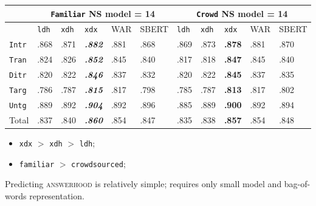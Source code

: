 \documentclass[handout,xcolor={dvipsnames}]{beamer}
\newcommand{\feat}[1]{\textsc{#1}}
\newcommand{\param}[1]{\texttt{#1}}
\begin{document}
\begin{frame}
\begin{table}[htb!]
\begin{center}
\setlength{\tabcolsep}{.35em}
\begin{tabular}{|l||l|l|l||l|l||l|l|l||l|l|}
\hline
 & \multicolumn{5}{c||}{\param{Fam\-il\-iar} NS model = 14} & \multicolumn{5}{c|}{\param{Crowd} NS model = 14} \\
\hline
    		& \param{ldh}	& \param{xdh} &	\param{xdx} & WAR	& {\scriptsize SBERT} & \param{ldh}	& \param{xdh} &	\param{xdx} & WAR	& {\scriptsize SBERT} \\ \hline
\hline
\param{Intr}  & .868 & .871 & \textit{\textbf{.882}} & .881 & .868 & .869 & .873 & \textbf{.878} & .881 & .870 \\ \hline
\param{Tran}  & .824 & .826 & \textit{\textbf{.852}} & .845 & .840 & .817 & .818 & \textbf{.847} & .845 & .840 \\ \hline
\param{Ditr}  & .820 & .822 & \textit{\textbf{.846}} & .837 & .832 & .820 & .822 & \textbf{.845} & .837 & .835 \\ \hline
\hline
\param{Targ}  & .786 & .787 & \textit{\textbf{.815}} & .817 & .798 & .785 & .787 & \textbf{.813} & .817 & .802 \\ \hline
\param{Untg}  & .889 & .892 & \textit{\textbf{.904}} & .892 & .896 & .885 & .889 & \textbf{.900} & .892 & .894 \\ \hline
\hline
Total & .837 & .840 & \textit{\textbf{.860}} & .854 & .847 & .835 & .838 & \textbf{.857} & .854 & .848 \\ \hline
\end{tabular}
\end{center}
\end{table}

\begin{itemize}
\pause
\item \param{xdx} $>$ \param{xdh} $>$ \param{ldh};
\pause
\item \param{familiar} $>$ \param{crowdsourced};
\end{itemize}

Predicting \feat{answerhood} is relatively simple; requires only small model and bag-of-words representation.

\end{frame}
\end{document}
